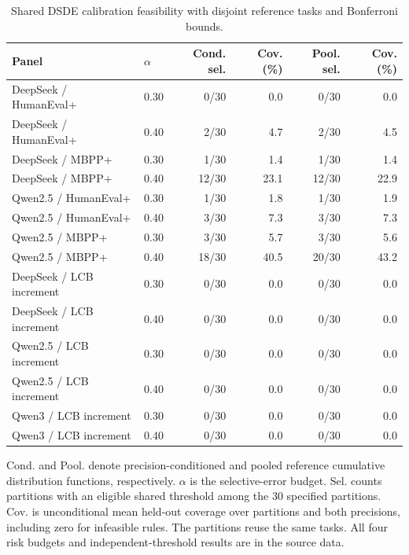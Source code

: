 \begin{table}[htbp]
\centering
\caption{Shared DSDE calibration feasibility with disjoint reference tasks and Bonferroni bounds.}
\label{tab:calibration}
\footnotesize
\begin{tabular}{llrrrr}
\toprule
Panel & $\alpha$ & Cond. sel. & Cov. (\%) & Pool. sel. & Cov. (\%) \\
\midrule
DeepSeek / HumanEval+ & 0.30 & 0/30 & 0.0 & 0/30 & 0.0 \\
DeepSeek / HumanEval+ & 0.40 & 2/30 & 4.7 & 2/30 & 4.5 \\
DeepSeek / MBPP+ & 0.30 & 1/30 & 1.4 & 1/30 & 1.4 \\
DeepSeek / MBPP+ & 0.40 & 12/30 & 23.1 & 12/30 & 22.9 \\
Qwen2.5 / HumanEval+ & 0.30 & 1/30 & 1.8 & 1/30 & 1.9 \\
Qwen2.5 / HumanEval+ & 0.40 & 3/30 & 7.3 & 3/30 & 7.3 \\
Qwen2.5 / MBPP+ & 0.30 & 3/30 & 5.7 & 3/30 & 5.6 \\
Qwen2.5 / MBPP+ & 0.40 & 18/30 & 40.5 & 20/30 & 43.2 \\
DeepSeek / LCB increment & 0.30 & 0/30 & 0.0 & 0/30 & 0.0 \\
DeepSeek / LCB increment & 0.40 & 0/30 & 0.0 & 0/30 & 0.0 \\
Qwen2.5 / LCB increment & 0.30 & 0/30 & 0.0 & 0/30 & 0.0 \\
Qwen2.5 / LCB increment & 0.40 & 0/30 & 0.0 & 0/30 & 0.0 \\
Qwen3 / LCB increment & 0.30 & 0/30 & 0.0 & 0/30 & 0.0 \\
Qwen3 / LCB increment & 0.40 & 0/30 & 0.0 & 0/30 & 0.0 \\
\bottomrule
\end{tabular}
\par\vspace{4pt}\begin{minipage}{0.98\linewidth}\footnotesize Cond. and Pool. denote precision-conditioned and pooled reference cumulative distribution functions, respectively. $\alpha$ is the selective-error budget. Sel. counts partitions with an eligible shared threshold among the 30 specified partitions. Cov. is unconditional mean held-out coverage over partitions and both precisions, including zero for infeasible rules. The partitions reuse the same tasks. All four risk budgets and independent-threshold results are in the source data.\end{minipage}
\end{table}
